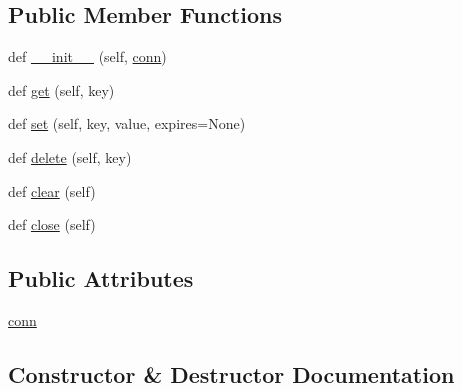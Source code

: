 \subsection*{Public Member Functions}
\begin{DoxyCompactItemize}
\item 
def \hyperlink{classpip_1_1__vendor_1_1cachecontrol_1_1caches_1_1redis__cache_1_1RedisCache_a028dcb6d34d0d858096d26ec0a70c639}{\+\_\+\+\_\+init\+\_\+\+\_\+} (self, \hyperlink{classpip_1_1__vendor_1_1cachecontrol_1_1caches_1_1redis__cache_1_1RedisCache_a10af698fe87d97c642a6624368d99f59}{conn})
\item 
def \hyperlink{classpip_1_1__vendor_1_1cachecontrol_1_1caches_1_1redis__cache_1_1RedisCache_a1c0ed79e45aa1435f77660d842d00a6f}{get} (self, key)
\item 
def \hyperlink{classpip_1_1__vendor_1_1cachecontrol_1_1caches_1_1redis__cache_1_1RedisCache_a3f3a9ca3c48de65c314cabb497e403de}{set} (self, key, value, expires=None)
\item 
def \hyperlink{classpip_1_1__vendor_1_1cachecontrol_1_1caches_1_1redis__cache_1_1RedisCache_aa8a8152f5a8f2aa6b08733a36bfa930b}{delete} (self, key)
\item 
def \hyperlink{classpip_1_1__vendor_1_1cachecontrol_1_1caches_1_1redis__cache_1_1RedisCache_ab98b163ad1dc868d399b2e6bc37bb3e4}{clear} (self)
\item 
def \hyperlink{classpip_1_1__vendor_1_1cachecontrol_1_1caches_1_1redis__cache_1_1RedisCache_adeb3c051e33255eefb591db14684a229}{close} (self)
\end{DoxyCompactItemize}
\subsection*{Public Attributes}
\begin{DoxyCompactItemize}
\item 
\hyperlink{classpip_1_1__vendor_1_1cachecontrol_1_1caches_1_1redis__cache_1_1RedisCache_a10af698fe87d97c642a6624368d99f59}{conn}
\end{DoxyCompactItemize}


\subsection{Constructor \& Destructor Documentation}
\mbox{\label{classpip_1_1__vendor_1_1cachecontrol_1_1caches_1_1redis__cache_1_1RedisCache_a028dcb6d34d0d858096d26ec0a70c639}} 
